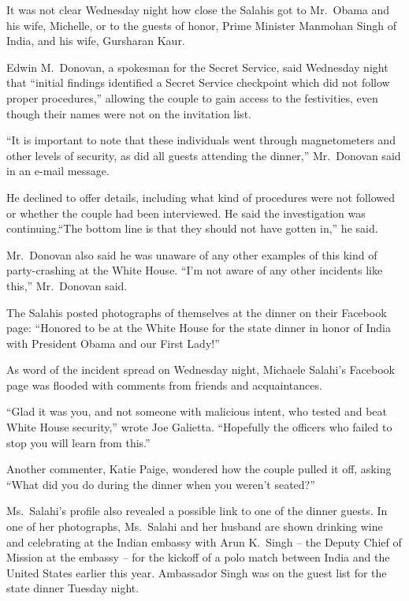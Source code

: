 ﻿\documentclass[12pt]{article}
\begin{document}
It was not clear Wednesday night how close the Salahis got to Mr.~Obama and his wife, Michelle, or
to the guests of honor, Prime Minister Manmohan Singh of India, and his wife, Gursharan Kaur.

Edwin M.~Donovan, a spokesman for the Secret Service, said Wednesday night that ``initial findings
identified a Secret Service checkpoint which did not follow proper procedures,'' allowing the couple
to gain access to the festivities, even though their names were not on the invitation list.

``It is important to note that these individuals went through magnetometers and other levels of
security, as did all guests attending the dinner,'' Mr.~Donovan said in an e-mail message.

He declined to offer details, including what kind of procedures were not followed or whether the
couple had been interviewed. He said the investigation was continuing.``The bottom line is that they
should not have gotten in,'' he said.

Mr.~Donovan also said he was unaware of any other examples of this kind of party-crashing at the
White House. ``I'm not aware of any other incidents like this,'' Mr.~Donovan said.

The Salahis posted photographs of themselves at the dinner on their Facebook page: ``Honored to be
at the White House for the state dinner in honor of India with President Obama and our First Lady!''

As word of the incident spread on Wednesday night, Michaele Salahi's Facebook page was flooded with
comments from friends and acquaintances.

``Glad it was you, and not someone with malicious intent, who tested and beat White House
security,'' wrote Joe Galietta. ``Hopefully the officers who failed to stop you will learn from
this.''

Another commenter, Katie Paige, wondered how the couple pulled it off, asking ``What did you do
during the dinner when you weren't seated?''

Ms.~Salahi's profile also revealed a possible link to one of the dinner guests. In one of her
photographs, Ms.~Salahi and her husband are shown drinking wine and celebrating at the Indian
embassy with Arun K.~Singh -- the Deputy Chief of Mission at the embassy -- for the kickoff of a polo
match between India and the United States earlier this year. Ambassador Singh was on the guest list
for the state dinner Tuesday night.
\end{document}
